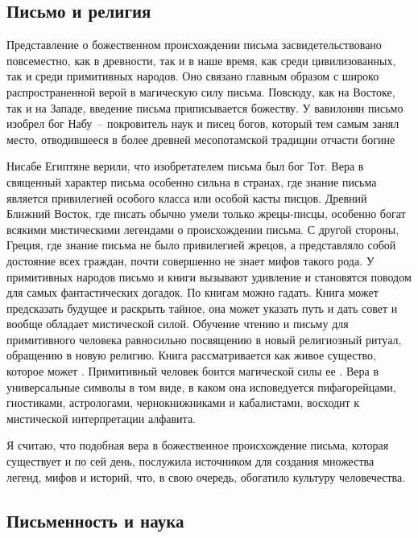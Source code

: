   \subsection{Письмо и религия}
  
  Представление о божественном происхождении письма засвидетельствовано
  повсеместно, как в древности, так и в наше время, как среди цивилизованных,
  так и среди примитивных народов. Оно связано главным образом с широко
  распространенной верой в магическую силу письма. Повсюду, как на Востоке, так
  и на Западе, введение письма приписывается божеству. У вавилонян письмо
  изобрел бог Набу~-- покровитель наук и писец богов, который тем самым занял
  место, отводившееся в более древней месопотамской традиции отчасти богине
  
  Нисабе Египтяне верили, что изобретателем письма был бог Тот. Вера в
  священный характер письма особенно сильна в странах, где знание письма
  является привилегией особого класса или особой касты писцов. Древний Ближний
  Восток, где писать обычно умели только жрецы-писцы, особенно богат всякими
  мистическими легендами о происхождении письма. С другой стороны, Греция, где
  знание письма не было привилегией жрецов, а представляло собой достояние всех
  граждан, почти совершенно не знает мифов такого рода. У примитивных народов
  письмо и книги вызывают удивление и становятся поводом для самых
  фантастических догадок. По книгам можно гадать. Книга может предсказать
  будущее и раскрыть тайное, она может указать путь и дать совет и вообще
  обладает мистической силой. Обучение чтению и письму для примитивного
  человека равносильно посвящению в новый религиозный ритуал, обращению в новую
  религию. Книга рассматривается как живое существо, которое может
  \grqq. Примитивный человек боится магической силы ее
  \grqq. Вера в универсальные символы в том виде, в каком она
  исповедуется пифагорейцами, гностиками, астрологами, чернокнижниками и
  кабалистами, восходит к мистической интерпретации алфавита.~\cite{bib:1}
  
  Я считаю, что подобная вера в божественное происхождение письма, которая
  существует и по сей день, послужила источником для создания множества легенд,
  мифов и историй, что, в свою очередь, обогатило культуру человечества.
  
  \subsection{Письменность и наука}
  
